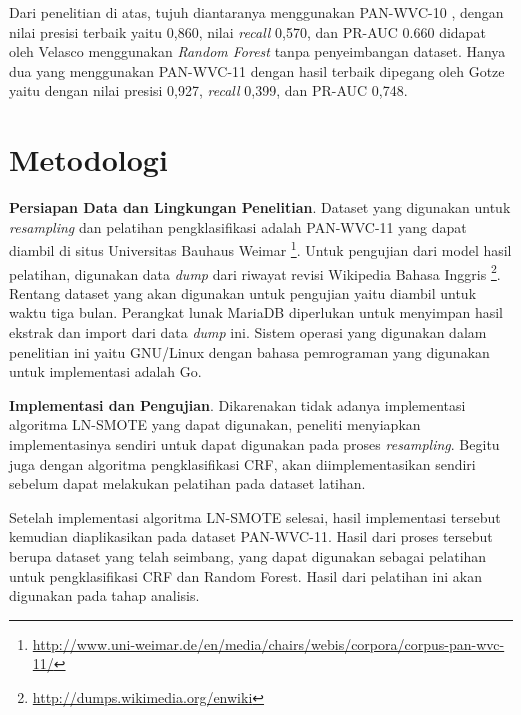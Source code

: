 \documentclass[12pt,a4paper,titlepage]{article}
\begin{document}
Dari penelitian di atas, tujuh diantaranya menggunakan PAN-WVC-10
\cite{gotze2014advanced}
\cite{mola2012wikipedia}
\cite{wang2010got}
\cite{adler2010detecting}
\cite{adler2011wikipedia}
\cite{west2011multilingual}
\cite{harpalani2011language}
, dengan nilai presisi terbaik yaitu 0,860, nilai \textit{recall} 0,570, dan PR-AUC 0.660 didapat oleh Velasco menggunakan \textit{Random Forest} tanpa penyeimbangan dataset.
Hanya dua yang menggunakan PAN-WVC-11
\cite{gotze2014advanced}
\cite{west2011multilingual}
dengan hasil terbaik dipegang oleh Gotze yaitu dengan nilai presisi 0,927, \textit{recall} 0,399, dan PR-AUC 0,748.


\section{Metodologi}\label{sec:metodologi}

\textbf{Persiapan Data dan Lingkungan Penelitian}.
Dataset yang digunakan untuk \textit{resampling} dan pelatihan pengklasifikasi adalah PAN-WVC-11 yang dapat diambil di situs Universitas Bauhaus Weimar \footnote{\RaggedRight\url{http://www.uni-weimar.de/en/media/chairs/webis/corpora/corpus-pan-wvc-11/}}.
Untuk pengujian dari model hasil pelatihan, digunakan data \textit{dump} dari riwayat revisi Wikipedia Bahasa Inggris \footnote{\url{http://dumps.wikimedia.org/enwiki}}.
Rentang dataset yang akan digunakan untuk pengujian yaitu diambil untuk waktu tiga bulan.
Perangkat lunak MariaDB diperlukan untuk menyimpan hasil ekstrak dan import dari data \textit{dump} ini.
Sistem operasi yang digunakan dalam penelitian ini yaitu GNU/Linux dengan bahasa pemrograman yang digunakan untuk implementasi adalah Go.

\textbf{Implementasi dan Pengujian}.
Dikarenakan tidak adanya implementasi algoritma LN-SMOTE yang dapat digunakan, peneliti menyiapkan implementasinya sendiri untuk dapat digunakan pada proses \textit{resampling}.
Begitu juga dengan algoritma pengklasifikasi CRF, akan diimplementasikan sendiri sebelum dapat melakukan pelatihan pada dataset latihan.

Setelah implementasi algoritma LN-SMOTE selesai, hasil implementasi tersebut kemudian diaplikasikan pada dataset PAN-WVC-11.
Hasil dari proses tersebut berupa dataset yang telah seimbang, yang dapat digunakan sebagai pelatihan untuk pengklasifikasi CRF dan Random Forest.
Hasil dari pelatihan ini akan digunakan pada tahap analisis.
\end{document}
